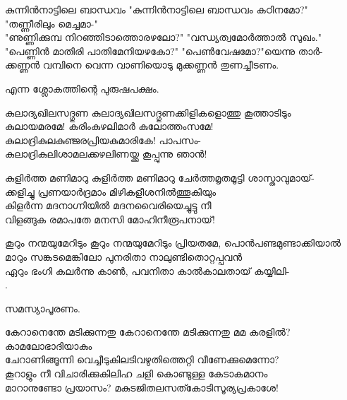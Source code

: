 \begin{enumerate}


\begin{slokam}{\VSv}{\RV}{കുന്നിൻനാട്ടിലെ ബാന്ധവം}
"കുന്നിൻനാട്ടിലെ ബാന്ധവം കഠിനമോ?" "തണ്ണീരിലും മെച്ചമാ-"\\
"ണുണ്ണിക്കുമ്പ നിറഞ്ഞിടാത്തൊരഴലോ?" "വന്ധ്യത്വമോർത്താൽ സുഖം."\\
"പെണ്ണിൻ മാതിരി പാതിമേനിയഴകോ?" "പെൺവേഷമോ?"യെന്നു താർ-\\
ക്കണ്ണൻ വമ്പിനെ വെന്ന വാണിയൊടു മുക്കണ്ണൻ തുണച്ചീടണം.
\end{slokam}


 എന്ന ശ്ലോകത്തിന്റെ പുരുഷപക്ഷം.  

\begin{slokam}{\VPv}{\Kund}{കുലാദ്യഖിലസദ്ഗുണ}
കുലാദ്യഖിലസദ്ഗുണക്കിളികളൊത്തു കൂത്താടിടും \\
കുലായമരമേ! കരിംകുഴലിമാർ കുലോത്തംസമേ! \\
കുലാദ്രികുലകുഞ്ജരപ്രിയകുമാരികേ! പാപസം-\\
കുലാദ്രികുലിശാമലക്കഴലിണയ്ക്കു കൂപ്പുന്നു ഞാൻ! 
\end{slokam}


\begin{slokam}{\VPv}{\RV}{കുളിർത്ത മണിമാറു}
കുളിർത്ത മണിമാറു ചേർത്തമൃതമൂട്ടി ശാസ്താവുമായ്‌-\\
ക്കളിച്ചു പ്രണയാർദ്രമാം മിഴികളീശനിൽത്തൂകിയും\\
കിളർന്ന മദനാഗ്നിയിൽ മദനവൈരിയെച്ചുട്ടു നീ\\
വിളങ്ങുക രമാപതേ മനസി മോഹിനീരൂപനായ്‌!
\end{slokam}


\begin{slokam}{\VSv}{\Unk}{കൂറും നന്മയുമേറിടും}
കൂറും നന്മയുമേറിടും പ്രിയതമേ, പൊന്‍പണ്ടമുണ്ടാക്കിയാല്‍\\
മാറും സങ്കടമെങ്കിലോ പുനരിതാ നാലുണ്ടിതൊറ്റപ്പവന്‍\\
ഏറും ഭംഗി കലര്‍ന്നു കാണ്‍, പവനിതാ കാല്‍കാലതായ്‌ കയ്യിലി-\\
.
\end{slokam}



സമസ്യാപൂരണം. 



\begin{slokam}{\VSr}{\VNM}{കേറാനെന്തേ മടിക്കുന്നതു}
കേറാനെന്തേ മടിക്കുന്നതു മമ കരളിൽ? കാമലോഭാദിയാകും\\
ചേറാണിങ്ങൂന്നി വെച്ചീടുകിലടിവഴുതിത്തെറ്റി വീണേക്കുമെന്നോ?\\
കൂറാളും നീ വിചാരിക്കുകിലിഹ ചളി കൊണ്ടുള്ള കേടാകമാനം\\
മാറാനുണ്ടോ പ്രയാസം? മകുടജിതലസത്കോടിസൂര്യപ്രകാശേ!
\end{slokam}


\end{enumerate}
